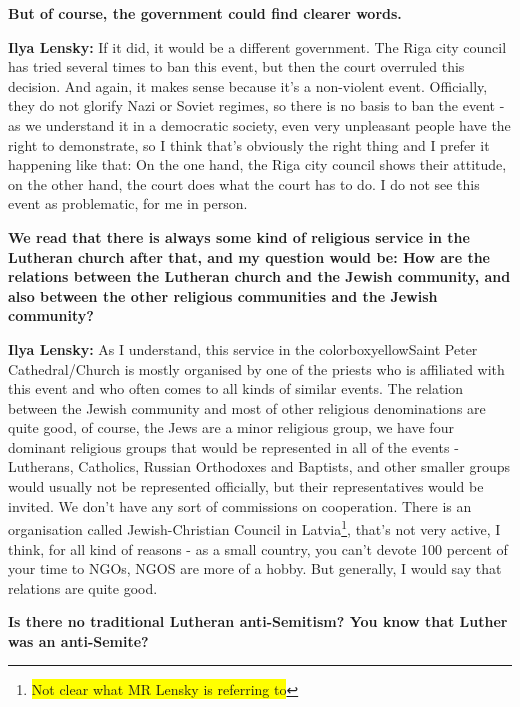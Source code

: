 \textbf{But of course, the government could find clearer words.} 

\textbf{Ilya Lensky:} If it did, it would be a different government. The Riga city council  has tried several times to ban this event, but then the court overruled this decision. And again, it makes sense because it’s a non-violent event. Officially, they do not glorify Nazi or Soviet regimes, so there is no basis to ban the event - as we understand it in a democratic society, even very unpleasant people have the right to demonstrate, so I think that’s obviously the right thing and I prefer it happening like that: On the one hand, the Riga city council shows their attitude, on the other hand, the court does what the court has to do. I do not see this event as problematic, for me in person.

\textbf{We read that there is always some kind of religious service in the Lutheran church after that, and my question would be: How are the relations between the Lutheran church and the Jewish community, and also between the other religious communities and the Jewish community?}

\textbf{Ilya Lensky:} As I understand, this service in the colorbox{yellow}{Saint Peter Cathedral/Church} is mostly organised by one of the priests who is affiliated with this event and who often comes to all kinds of similar events. The relation between the Jewish community and most of other religious denominations are quite good, of course, the Jews are a minor religious group, we have four dominant religious groups that would be represented in all of the events - Lutherans, Catholics, Russian Orthodoxes and Baptists, and other smaller groups would usually not be represented officially, but their representatives would be invited. We don’t have any sort of commissions on cooperation. There is an organisation called Jewish-Christian Council in Latvia\footnote{\colorbox{yellow}{Not clear what MR Lensky is referring to}}, that’s not very active, I think, for all kind of reasons - as a small country, you can’t devote 100 percent of your time to NGOs, NGOS are more of a hobby. But generally, I would say that relations are quite good. 

\textbf{Is there no traditional Lutheran anti-Semitism? You know that Luther was an anti-Semite?} 

